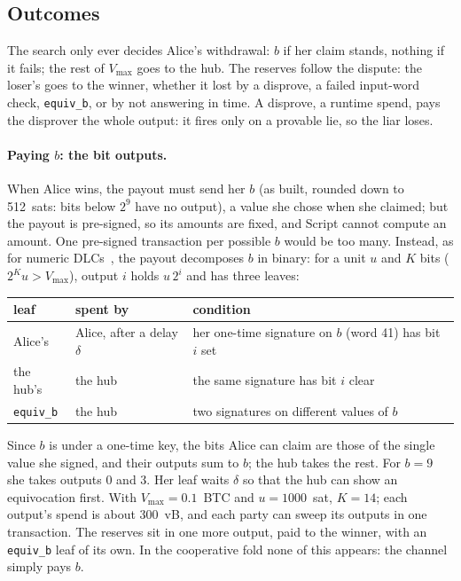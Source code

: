 \documentclass[11pt]{article}
\newcommand{\vmax}{V_{\max}}
\newcommand{\tx}[1]{\texttt{#1}}
\begin{document}
\subsection{Outcomes}
\label{sec:outcomes}

The search only ever decides Alice's withdrawal: $b$ if her claim
stands, nothing if it fails; the rest of $\vmax$ goes to the hub. The
reserves follow the dispute: the loser's goes to the winner, whether it
lost by a disprove, a failed input-word check, \tx{equiv\_b}, or by not
answering in time. A disprove, a runtime spend, pays the disprover the
whole output: it fires only on a provable lie, so the liar loses.

\paragraph{Paying $b$: the bit outputs.} When Alice wins, the payout
must send her $b$ (as built, rounded down to 512~sats: bits below $2^9$
have no output), a value she chose when she claimed; but the
payout is pre-signed, so its amounts are fixed, and Script cannot
compute an amount. One pre-signed transaction per possible $b$ would be
too many. Instead, as for numeric DLCs~\cite{dlcnumeric}, the payout
decomposes $b$ in binary: for a unit $u$ and $K$ bits ($2^K u > \vmax$),
output $i$ holds $u\,2^i$ and has three leaves:
\begin{center}
\small
\begin{tabular}{lll}
\toprule
leaf & spent by & condition \\
\midrule
Alice's & Alice, after a delay $\delta$ & her one-time signature on $b$ (word 41) has bit $i$ set \\
the hub's & the hub & the same signature has bit $i$ clear \\
\tx{equiv\_b} & the hub & two signatures on different values of $b$ \\
\bottomrule
\end{tabular}
\end{center}
Since $b$ is under a one-time key, the bits Alice can claim are those of
the single value she signed, and their outputs sum to $b$; the hub takes
the rest. For $b = 9$ she takes outputs 0 and 3. Her leaf waits $\delta$
so that the hub can show an equivocation first. With $\vmax = 0.1$~BTC
and $u = 1000$~sat, $K = 14$; each output's spend is about 300~vB, and
each party can sweep its outputs in one transaction. The reserves sit in
one more output, paid to the winner, with an \tx{equiv\_b} leaf of its
own. In the cooperative fold none of this appears: the channel simply
pays $b$.
\end{document}
